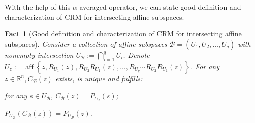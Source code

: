 \documentclass[smallextended,numbook,nospthms]{svjour3}
\theoremstyle{plain}
\newtheorem{fact}[theorem]{Fact}
\theoremstyle{definition}
\def\RR{\mathds R}
\begin{document}
With the help of this $\alpha$-averaged operator, we can state good definition and characterization of CRM for intersecting affine subspaces.

\begin{fact}[Good definition and characterization of CRM for intersecting affine subspaces]\label{fact:CRM well def char} Consider a collection of affine subspaces $\mathcal{B}=\left(U_{1}, U_{2}, \ldots, U_{q}\right)$ with nonempty intersection $U_{\mathcal{B}}:=\bigcap_{i=1}^{q} U_{i}$. Denote $U_{z}:=\operatorname{aff}\left\{z, R_{U_{1}}(z), R_{U_{2}} R_{U_{1}}(z), \ldots, R_{U_{q}} \cdots R_{U_{2}} R_{U_{1}}(z)\right\}$. For any $z \in \RR^{n}, C_{\mathcal{B}}(z)$ exists, is unique and fulfills:
	\begin{listi}
		\item for any $s \in U_{\mathcal{B}}$, $C_{\mathcal{B}}(z)=P_{U_{z}}(s)$;
		\item $P_{U_{\mathcal{B}}}\left(C_{\mathcal{B}}(z)\right)=P_{U_{\mathcal{B}}}(z)$.
	\end{listi}
\end{fact}
\end{document}
